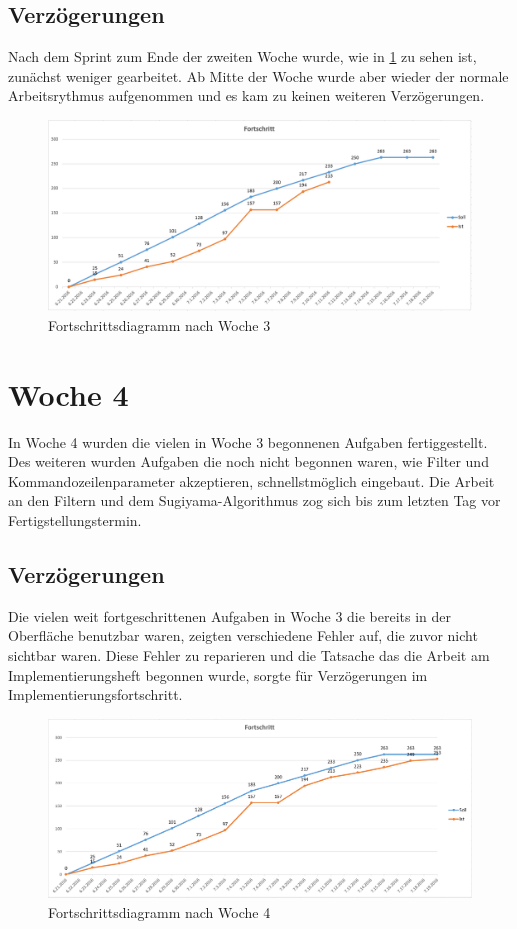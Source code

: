 \subsection{Verzögerungen}
Nach dem Sprint zum Ende der zweiten Woche wurde, wie in \ref{fig:week_three_diagram} zu sehen ist, zunächst weniger gearbeitet. Ab Mitte der Woche wurde aber wieder der normale Arbeitsrythmus aufgenommen und es kam zu keinen weiteren Verzögerungen.
\begin{figure}[!htbp]
	\centering
	\includegraphics[width=380pt]{resourcen/week_three_diagram.PNG}
	\caption{Fortschrittsdiagramm nach Woche 3}
	\label{fig:week_three_diagram}
\end{figure}

\newpage

\section{Woche 4}
In Woche 4 wurden die vielen in Woche 3 begonnenen Aufgaben fertiggestellt. Des weiteren wurden Aufgaben die noch nicht begonnen waren, wie Filter und Kommandozeilenparameter akzeptieren, schnellstmöglich eingebaut.
Die Arbeit an den Filtern und dem Sugiyama-Algorithmus zog sich bis zum letzten Tag vor Fertigstellungstermin.
\subsection{Verzögerungen}
Die vielen weit fortgeschrittenen Aufgaben in Woche 3 die bereits in der Oberfläche benutzbar waren, zeigten verschiedene Fehler auf, die zuvor nicht sichtbar waren. Diese Fehler zu reparieren und die Tatsache das die Arbeit am Implementierungsheft begonnen wurde, sorgte für Verzögerungen im Implementierungsfortschritt.
\begin{figure}[!htbp]
	\centering
	\includegraphics[width=380pt]{resourcen/week_four_diagram.PNG}
	\caption{Fortschrittsdiagramm nach Woche 4}
	\label{fig:week_four_diagram}
\end{figure}

